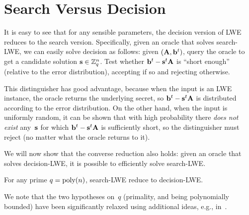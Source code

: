 \documentclass[11pt]{article}
\begin{document}
\section{Search Versus Decision}
\label{sec:search-decision}

It is easy to see that for any sensible parameters, the decision
version of LWE reduces to the search version. Specifically, given an
oracle that solves search-LWE, we can easily solve decision as
follows: given $(\mathbf{A}, \mathbf{b}^{t})$, query the oracle to get a
candidate solution $\mathbf{s} \in \mathbb{Z}_q^{n}$. Test whether
$\mathbf{b}^{t} - \mathbf{s}^{t} \mathbf{A}$ is ``short enough'' (relative to the
error distribution), accepting if so and rejecting otherwise.

This distinguisher has good advantage, because when the input is an
LWE instance, the oracle returns the underlying secret, so
$\mathbf{b}^{t} - \mathbf{s}^{t} \mathbf{A}$ is distributed according to the error
distribution. On the other hand, when the input is uniformly random,
it can be shown that with high probability there \emph{does not exist}
any~$\mathbf{s}$ for which $\mathbf{b}^{t} - \mathbf{s}^{t} \mathbf{A}$ is sufficiently
short, so the distinguisher must reject (no matter what the oracle
returns to it).

We will now show that the converse reduction also holds: given an
oracle that solves decision-LWE, it is possible to efficiently solve
search-LWE.

\begin{theorem}
  For any prime $q = \operatorname{poly}(n)$, search-LWE reduce to decision-LWE.
\end{theorem}

We note that the two hypotheses on~$q$ (primality, and being
polynomially bounded) have been significantly relaxed using additional
ideas, e.g., in~\cite{DBLP:conf/stoc/Peikert09}.
\end{document}
